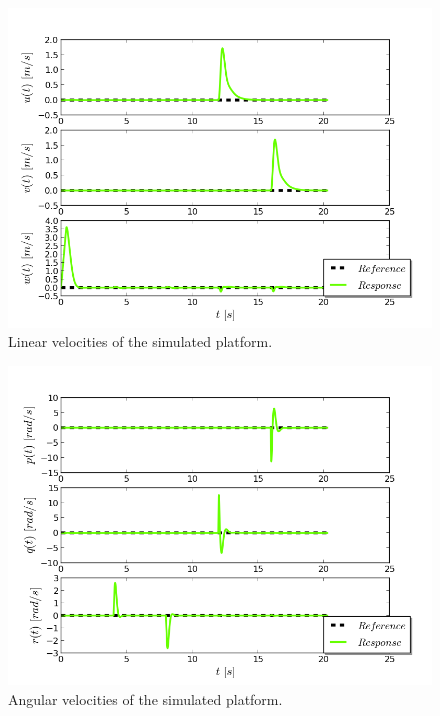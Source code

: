\begin{figure}[H]
\centering
\includegraphics[scale=0.7]{Images/Chapter5/ardrone/lin_velocity_control.png}
\caption{Linear velocities of the simulated platform. }
\label{fig:ardrone_lin_vel}
\end{figure}

\begin{figure}[H]
\centering
\includegraphics[scale=0.7]{Images/Chapter5/ardrone/ang_velocity_control.png}
\caption{Angular velocities of the simulated platform.}
\label{fig:ardrone_ang_vel}
\end{figure}

